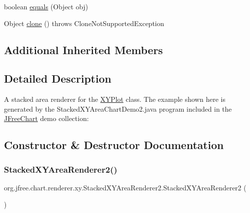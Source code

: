 \begin{DoxyCompactItemize}
\item 
boolean \mbox{\hyperlink{classorg_1_1jfree_1_1chart_1_1renderer_1_1xy_1_1_stacked_x_y_area_renderer2_a53f763e31ca8d3ace13f01ee9f977bcb}{equals}} (Object obj)
\item 
Object \mbox{\hyperlink{classorg_1_1jfree_1_1chart_1_1renderer_1_1xy_1_1_stacked_x_y_area_renderer2_ac5d46f09c2c8f6273314599458879a21}{clone}} ()  throws Clone\+Not\+Supported\+Exception 
\end{DoxyCompactItemize}
\subsection*{Additional Inherited Members}


\subsection{Detailed Description}
A stacked area renderer for the \mbox{\hyperlink{}{X\+Y\+Plot}} class. The example shown here is generated by the {\ttfamily Stacked\+X\+Y\+Area\+Chart\+Demo2.\+java} program included in the \mbox{\hyperlink{classorg_1_1jfree_1_1chart_1_1_j_free_chart}{J\+Free\+Chart}} demo collection\+: ~\newline
~\newline
  

\subsection{Constructor \& Destructor Documentation}
\mbox{\label{classorg_1_1jfree_1_1chart_1_1renderer_1_1xy_1_1_stacked_x_y_area_renderer2_a3969b14d74ff901bbede121e06dc81c2}} 
\subsubsection{\texorpdfstring{Stacked\+X\+Y\+Area\+Renderer2()}{StackedXYAreaRenderer2()}\hspace{0.1cm}{\footnotesize\ttfamily [1/2]}}
{\footnotesize\ttfamily org.\+jfree.\+chart.\+renderer.\+xy.\+Stacked\+X\+Y\+Area\+Renderer2.\+Stacked\+X\+Y\+Area\+Renderer2 (\begin{DoxyParamCaption}{ }\end{DoxyParamCaption})}

